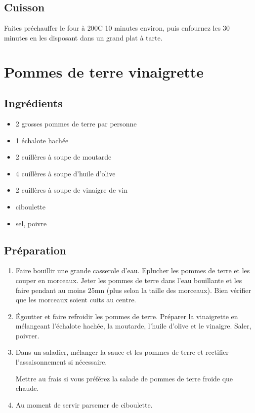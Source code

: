 \subsection*{Cuisson}
Faites préchauffer le four à 200\degres C 10 minutes environ, puis enfournez les 30 minutes en les disposant dans un grand plat à tarte.


\newpage
\section{Pommes de terre vinaigrette}
\subsection*{Ingrédients}
\begin{itemize}
\item 2 grosses pommes de terre par personne
\item 1 échalote hachée
\item 2 cuillères à soupe de moutarde
\item 4 cuillères à soupe d'huile d'olive
\item 2 cuillères à soupe de vinaigre de vin
\item ciboulette
\item sel, poivre
\end{itemize}

\subsection*{Préparation}
\begin{enumerate}
\item Faire bouillir une grande casserole d'eau. Eplucher les pommes de terre et les couper en morceaux. Jeter les pommes de terre dans l'eau bouillante et les faire pendant au moins 25mn (plus selon la taille des morceaux). Bien vérifier que les morceaux soient cuits au centre.

\item Égoutter et faire refroidir les pommes de terre. Préparer la vinaigrette en mélangeant l'échalote hachée, la moutarde, l'huile d'olive et le vinaigre. Saler, poivrer.

\item Dans un saladier, mélanger la sauce et les pommes de terre et rectifier l'assaisonnement si nécessaire.

\begin{remarque}
Mettre au frais si vous préférez la salade de pommes de terre froide que chaude.
\end{remarque}

\item Au moment de servir parsemer de ciboulette.
\end{enumerate}
